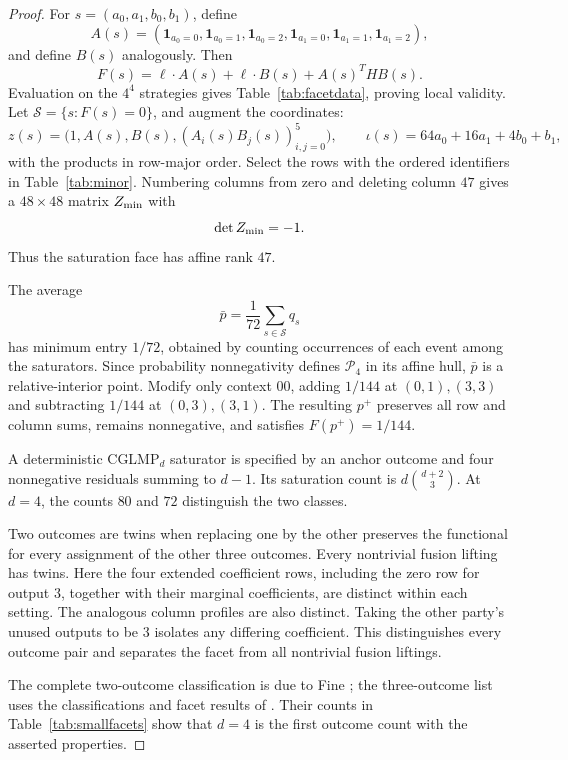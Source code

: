 \documentclass[11pt]{amsart}
\theoremstyle{remark}
\theoremstyle{plain}
\numberwithin{equation}{section}
\newcommand{\ind}{\mathbf 1}
\newcommand{\NS}{\mathcal P}
\begin{document}
\begin{proof}
For \(s=(a_0,a_1,b_0,b_1)\), define
\[
 A(s)=(\ind_{a_0=0},\ind_{a_0=1},\ind_{a_0=2},
       \ind_{a_1=0},\ind_{a_1=1},\ind_{a_1=2}),
\]
and define \(B(s)\) analogously. Then
\[
 F(s)=\ell\cdot A(s)+\ell\cdot B(s)+A(s)^THB(s).
\]
Evaluation on the \(4^4\) strategies gives
Table~\ref{tab:facetdata}, proving local validity.
Let \(\mathcal S=\{s:F(s)=0\}\), and augment the coordinates:
\[
 z(s)=\bigl(1,A(s),B(s),(A_i(s)B_j(s))_{i,j=0}^5\bigr),
 \qquad \iota(s)=64a_0+16a_1+4b_0+b_1,
\]
with the products in row-major order.
Select the rows with the ordered identifiers in
Table~\ref{tab:minor}. Numbering columns from zero and deleting
column \(47\) gives a \(48\times48\) matrix \(Z_{\rm min}\) with
\begin{equation}\label{eq:minor}
 \det Z_{\rm min}=-1.
\end{equation}
Thus the saturation face has affine rank \(47\).

The average
\[
 \bar p=\frac1{72}\sum_{s\in\mathcal S}q_s
\]
has minimum entry \(1/72\), obtained by counting occurrences of
each event among the saturators.
Since probability nonnegativity defines \(\NS_4\) in its affine
hull, \(\bar p\) is a relative-interior point.
Modify only context \(00\), adding \(1/144\) at \((0,1),(3,3)\)
and subtracting \(1/144\) at \((0,3),(3,1)\).
The resulting \(p^+\) preserves all row and column sums, remains
nonnegative, and satisfies \(F(p^+)=1/144\).

A deterministic CGLMP\(_d\) saturator is specified by an anchor
outcome and four nonnegative residuals summing to \(d-1\).
Its saturation count is \(d\binom{d+2}{3}\).
At \(d=4\), the counts \(80\) and \(72\) distinguish the two classes.

Two outcomes are twins when replacing one by the other preserves
the functional for every assignment of the other three outcomes.
Every nontrivial fusion lifting has twins.
Here the four extended coefficient rows, including the zero row
for output \(3\), together with their marginal coefficients, are
distinct within each setting. The analogous column profiles are
also distinct. Taking the other party's unused outputs to be \(3\)
isolates any differing coefficient. This distinguishes every
outcome pair and separates the facet from all nontrivial fusion
liftings.

The complete two-outcome classification is due to Fine
\cite{Fine}; the three-outcome list uses the classifications and
facet results of \cite{CG,Masanes}.
Their counts in Table~\ref{tab:smallfacets} show that \(d=4\) is the
first outcome count with the asserted properties.
\end{proof}
\end{document}
